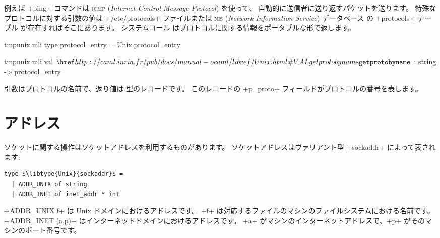 例えば \ml+ping+ コマンドは \textsc{icmp} (\emph{Internet Control Message Protocol}) を使って、
自動的に送信者に送り返すパケットを送ります。
特殊なプロトコルに対する引数の値は \ml+/etc/protocols+ ファイルまたは
\textsc{nis} (\emph{Network Information Service}) データベース の \ml+protocols+ テーブル
が存在すればそこにあります。
システムコール  はプロトコルに関する情報をポータブルな形で返します。
%
\begin{codefile}{tmpunix.mli}
type protocol_entry = Unix.protocol_entry
\end{codefile}
%
\begin{listingcodefile}{tmpunix.mli}
val $\libvalue{Unix}{getprotobyname}$ : string -> protocol_entry
\end{listingcodefile}
%
引数はプロトコルの名前で、返り値は  型のレコードです。
このレコードの \ml+p_proto+ フィールドがプロトコルの番号を表します。

\section{アドレス}

ソケットに関する操作はソケットアドレスを利用するものがあります。
ソケットアドレスはヴァリアント型 \ml+sockaddr+ によって表されます:
\begin{lstlisting}
type $\libtype{Unix}{sockaddr}$ =
  | ADDR_UNIX of string
  | ADDR_INET of inet_addr * int
\end{lstlisting}
\ml+ADDR_UNIX f+ は Unix ドメインにおけるアドレスです。
\ml+f+ は対応するファイルのマシンのファイルシステムにおける名前です。
\ml+ADDR_INET (a,p)+ はインターネットドメインにおけるアドレスです。
\ml+a+ がマシンのインターネットアドレスで、\ml+p+ がそのマシンのポート番号です。

